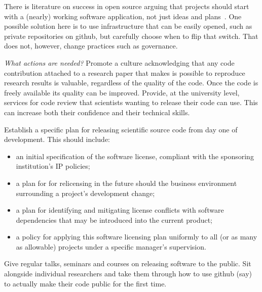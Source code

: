 \documentclass[a4paper,UKenglish]{dagman}
\begin{document}
There is literature on success in open source arguing that projects should start with a (nearly) working software application, not just ideas and plans~\cite{senyard2004have}. One possible solution here is to use infrastructure that can be easily opened, such as private repositories on github, but carefully choose when to flip that switch. That does not, however, change practices such as governance.



\emph{What actions are needed?}
Promote a culture acknowledging that any code contribution attached to a research paper that makes is possible to reproduce research results is valuable, regardless of the quality of the code. Once the code is freely available its quality can be improved.
Provide, at the university level, services for code review that scientists wanting to release their code can use. This can increase both their confidence and their technical skills. 


Establish a specific plan for releasing scientific source code from day one of development. This should include:
\begin{itemize}
\item an initial specification of the software license, compliant with the sponsoring institution's IP policies;
\item a plan for for relicensing in the future should the business environment surrounding a project's development change;
\item a plan for identifying and mitigating license conflicts with software dependencies that may be introduced into the current product;
\item a policy for applying this software licensing plan uniformly to all (or as many as allowable) projects under a specific manager's supervision. 
\end{itemize}

Give regular talks, seminars and courses on releasing software to the public. 
Sit alongside individual researchers and take them through how to use github (say) to actually make their code public for the first time.
\end{document}
